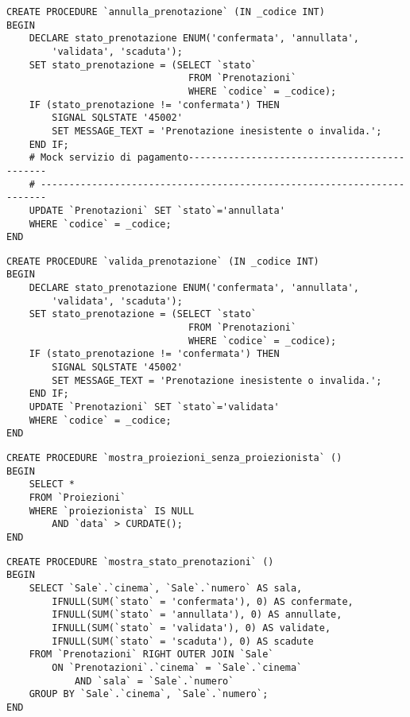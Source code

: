 \begin{verbatim}
CREATE PROCEDURE `annulla_prenotazione` (IN _codice INT)
BEGIN
    DECLARE stato_prenotazione ENUM('confermata', 'annullata',
        'validata', 'scaduta');
    SET stato_prenotazione = (SELECT `stato`
                                FROM `Prenotazioni`
                                WHERE `codice` = _codice);
    IF (stato_prenotazione != 'confermata') THEN
        SIGNAL SQLSTATE '45002'
        SET MESSAGE_TEXT = 'Prenotazione inesistente o invalida.';
    END IF;
    # Mock servizio di pagamento---------------------------------------------
    # -----------------------------------------------------------------------
    UPDATE `Prenotazioni` SET `stato`='annullata'
    WHERE `codice` = _codice;
END
\end{verbatim}

\pagebreak
\begin{verbatim}
CREATE PROCEDURE `valida_prenotazione` (IN _codice INT)
BEGIN
    DECLARE stato_prenotazione ENUM('confermata', 'annullata',
        'validata', 'scaduta');
    SET stato_prenotazione = (SELECT `stato`
                                FROM `Prenotazioni`
                                WHERE `codice` = _codice);
    IF (stato_prenotazione != 'confermata') THEN
        SIGNAL SQLSTATE '45002'
        SET MESSAGE_TEXT = 'Prenotazione inesistente o invalida.';
    END IF;
    UPDATE `Prenotazioni` SET `stato`='validata'
    WHERE `codice` = _codice;
END
\end{verbatim}

\begin{verbatim}
CREATE PROCEDURE `mostra_proiezioni_senza_proiezionista` ()
BEGIN
    SELECT *
    FROM `Proiezioni`
    WHERE `proiezionista` IS NULL
        AND `data` > CURDATE();
END
\end{verbatim}

\begin{verbatim}
CREATE PROCEDURE `mostra_stato_prenotazioni` ()
BEGIN
    SELECT `Sale`.`cinema`, `Sale`.`numero` AS sala,
        IFNULL(SUM(`stato` = 'confermata'), 0) AS confermate,
        IFNULL(SUM(`stato` = 'annullata'), 0) AS annullate,
        IFNULL(SUM(`stato` = 'validata'), 0) AS validate,
        IFNULL(SUM(`stato` = 'scaduta'), 0) AS scadute
    FROM `Prenotazioni` RIGHT OUTER JOIN `Sale`
        ON `Prenotazioni`.`cinema` = `Sale`.`cinema`
            AND `sala` = `Sale`.`numero`
    GROUP BY `Sale`.`cinema`, `Sale`.`numero`;
END
\end{verbatim}

